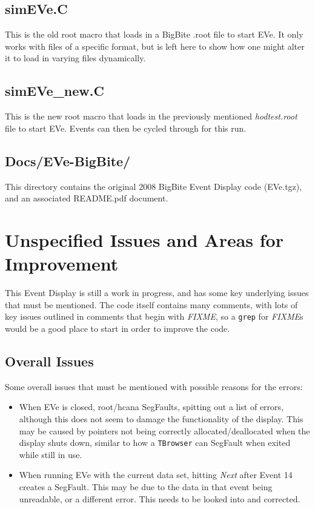 \documentclass[12pt]{article}
\numberwithin{equation}{section}
\begin{document}
\subsection{simEVe.C}
This is the old root macro that loads in a BigBite .root file to start EVe. It only works with files of a specific format, but is left here to show how one might alter it to load in varying files dynamically. 

\subsection{simEVe\_new.C}
This is the new root macro that loads in the previously mentioned \textit{hodtest.root} file to start EVe. Events can then be cycled through for this run.   

\subsection{Docs/EVe-BigBite/}
This directory contains the original 2008 BigBite Event Display code (EVe.tgz), and an associated README.pdf document.

\section{Unspecified Issues and Areas for Improvement}
This Event Display is still a work in progress, and has some key underlying issues that must be mentioned. The code itself contains many comments, with lots of key issues outlined in comments that begin with \textit{FIXME}, so a \texttt{grep} for \textit{FIXME}s would be a good place to start in order to improve the code.

\subsection{Overall Issues}
Some overall issues that must be mentioned with possible reasons for the errors:
\begin{itemize}
\item When EVe is closed, root/hcana SegFaults, spitting out a list of errors, although this does not seem to damage the functionality of the display. This may be caused by pointers not being correctly allocated/deallocated when the display shuts down, similar to how a \texttt{TBrowser} can SegFault when exited while still in use.
\item When running EVe with the current data set, hitting \textit{Next} after Event 14 creates a SegFault. This may be due to the data in that event being unreadable, or a different error. This needs to be looked into and corrected.
\end{itemize}
\end{document}
